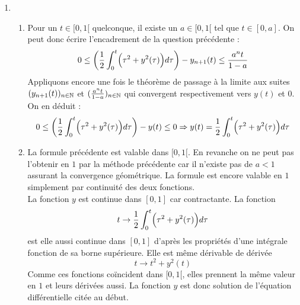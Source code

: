 \begin{enumerate}
\begin{enumerate}
\item Notons $I_n(t)$ l'expression que l'on nous demande d'encadrer. Remplaçons $y_{n+1}(t)$ par son expression intégrale. On obtient :
\begin{displaymath}
 I_n(t) = \frac{1}{2}\int_0^t\Bigl( y^2(\tau) - y_n^2(\tau)\Bigr) d\tau \geq 0
\end{displaymath}
car $0\leq y_n(\tau)\leq y(\tau)$ les suites définissant $y$ étant croissantes. D'autre part :
\begin{displaymath}
 I_n(t)= \frac{1}{2} \int_0^t
\Bigl( \underset{\leq 2}{\underbrace{y(\tau) + y_n(\tau)}}\Bigr)
\Bigl( \underset{\leq \frac{a^n}{1-a}}{\underbrace{y(\tau) - y_n(\tau)}}\Bigr)
 d\tau
\leq \int_0^t \frac{a^n}{1-a}d\tau = \frac{a^nt}{1-a}
\end{displaymath}
\end{enumerate}
\item \begin{enumerate}
 \item Pour un $t\in [0,1[$ quelconque, il existe un $a\in [0 , 1[$ tel que $t\in [0,a]$. On peut donc écrire l'encadrement de la question précédente :
\begin{displaymath}
 0 \leq \left( \frac{1}{2}\int_0^t\Bigl(\tau^2 + y^2(\tau) \Bigr)d\tau \right) -y_{n+1}(t) \leq \frac{a^n t}{1-a}
\end{displaymath}
Appliquons encore une fois le théorème de passage à la limite aux suites $(y_{n+1}(t))_{n\in \mathbb{N}}$ et $(\frac{a^n t}{1-a})_{n\in \mathbb{N}}$ qui convergent respectivement vers $y(t)$ et $0$. On en déduit :
\begin{displaymath}
 0 \leq \left( \frac{1}{2}\int_0^t\Bigl(\tau^2 + y^2(\tau) \Bigr)d\tau \right) -y(t) \leq 0 \\
\Rightarrow
y(t) = \frac{1}{2}\int_0^t\Bigl(\tau^2 + y^2(\tau) \Bigr)d\tau
\end{displaymath}

\item La formule précédente est valable dans $[0,1[$. En revanche on ne peut pas l'obtenir en $1$ par la méthode précédente car il n'existe pas de $a<1$ assurant la convergence géométrique. La formule est encore valable en $1$ simplement par continuité des deux fonctions.\\
La fonction $y$ est continue dans $[0,1]$ car contractante. La fonction
\begin{displaymath}
 t \rightarrow \frac{1}{2}\int_0^t\Bigl(\tau^2 + y^2(\tau) \Bigr)d\tau
\end{displaymath}
est elle aussi continue dans $[0,1]$ d'après les propriétés d'une intégrale fonction de sa borne supérieure. Elle est même dérivable de dérivée
\begin{displaymath}
 t \rightarrow t^2 + y^2(t)
\end{displaymath}
Comme ces fonctions co{\"i}ncident dans $[0,1[$, elles prennent la même valeur en $1$ et leurs dérivées aussi. La fonction $y$ est donc solution de l'équation différentielle citée au début.
\end{enumerate}
\end{enumerate}
